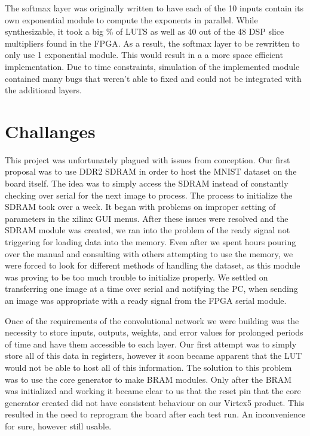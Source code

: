 \documentclass[11pt]{article}
\begin{document}
The softmax layer was originally written to have each of the 10 inputs contain its own exponential module to compute the exponents in parallel. While synthesizable, it took a big \% of LUTS as well as 40 out of the 48 DSP slice multipliers found in the FPGA. As a result, the softmax layer to be rewritten to only use 1 exponential module. This would result in a a more space efficient implementation. Due to time constraints, simulation of the implemented module contained many bugs that weren’t able to fixed and could not be integrated with the additional layers. 

\section{Challanges}

This project was unfortunately plagued with issues from conception. Our first proposal was to use DDR2 SDRAM in order to host the MNIST dataset on the board itself. The idea was to simply access the SDRAM instead of constantly checking over serial for the next image to process. The process to initialize the SDRAM took over a week. It began with problems on improper setting of parameters in the xilinx GUI menus. After these issues were resolved and the SDRAM module was created, we ran into the problem of the ready signal not triggering for loading data into the memory. Even after we spent hours pouring over the manual and consulting with others attempting to use the memory, we were forced to look for different methods of handling the dataset, as this module was proving to be too much trouble to initialize properly. We settled on transferring one image at a time over serial and notifying the PC, when sending an image was appropriate with a ready signal from the FPGA serial module. 

Once of the requirements of the convolutional network we were building was the necessity to store inputs, outputs, weights, and error values for prolonged periods of time and have them accessible to each layer. Our first attempt was to simply store all of this data in registers, however it soon became apparent that the LUT would not be able to host all of this information. The solution to this problem was to use the core generator to make BRAM modules. Only after the BRAM was initialized and working it became clear to us that the reset pin that the core generator created did not have consistent behaviour on our Virtex5 product. This resulted in the need to reprogram the board after each test run. An inconvenience for sure, however still usable.
\end{document}
